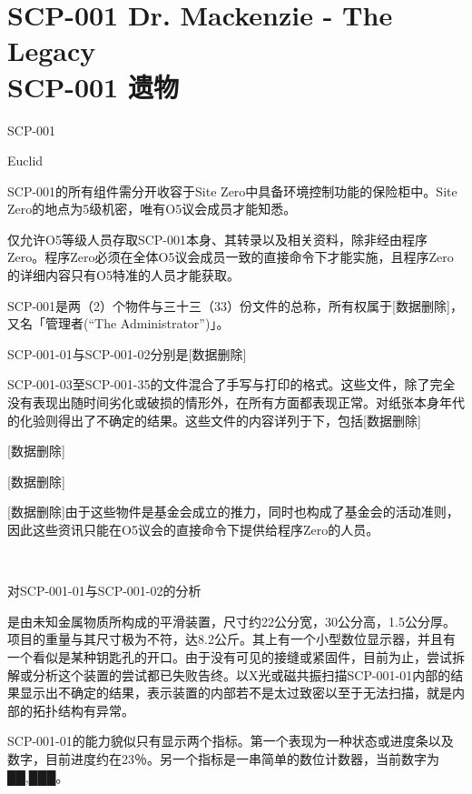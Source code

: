 \chapter[SCP-001 遗物]{
	SCP-001 Dr. Mackenzie -  The Legacy\\
	SCP-001 遗物
}

\label{chap:SCP-001.the.legacy}

SCP-001

Euclid

SCP-001的所有组件需分开收容于Site Zero中具备环境控制功能的保险柜中。Site Zero的地点为5级机密，唯有O5议会成员才能知悉。

仅允许O5等级人员存取SCP-001本身、其转录以及相关资料，除非经由程序Zero。程序Zero必须在全体O5议会成员一致的直接命令下才能实施，且程序Zero的详细内容只有O5特准的人员才能获取。

SCP-001是两（2）个物件与三十三（33）份文件的总称，所有权属于{[}数据删除]，又名「管理者(“The Administrator”)」。

SCP-001-01与SCP-001-02分别是{[}数据删除]

SCP-001-03至SCP-001-35的文件混合了手写与打印的格式。这些文件，除了完全没有表现出随时间劣化或破损的情形外，在所有方面都表现正常。对纸张本身年代的化验则得出了不确定的结果。这些文件的内容详列于下，包括{[}数据删除]

{[}数据删除]

{[}数据删除]

{[}数据删除]由于这些物件是基金会成立的推力，同时也构成了基金会的活动准则，因此这些资讯只能在O5议会的直接命令下提供给程序Zero的人员。

\hr

\\

对SCP-001-01与SCP-001-02的分析

是由未知金属物质所构成的平滑装置，尺寸约22公分宽，30公分高，1.5公分厚。项目的重量与其尺寸极为不符，达8.2公斤。其上有一个小型数位显示器，并且有一个看似是某种钥匙孔的开口。由于没有可见的接缝或紧固件，目前为止，尝试拆解或分析这个装置的尝试都已失败告终。以X光或磁共振扫描SCP-001-01内部的结果显示出不确定的结果，表示装置的内部若不是太过致密以至于无法扫描，就是内部的拓扑结构有异常。

SCP-001-01的能力貌似只有显示两个指标。第一个表现为一种状态或进度条以及数字，目前进度约在23％。另一个指标是一串简单的数位计数器，当前数字为██,███。


